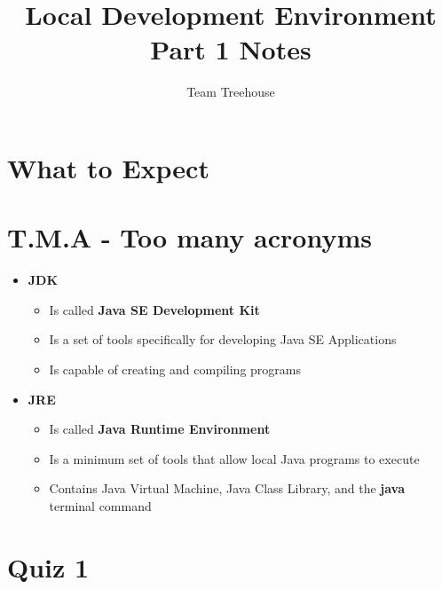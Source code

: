 \documentclass[12pt]{article}
\begin{document}
\title{Local Development Environment Part 1 Notes}
\author{Team Treehouse}
\maketitle

\section{What to Expect}

\bigskip

\section{T.M.A - Too many acronyms}

\bigskip

\begin{itemize}
    \item \textbf{JDK}
    \begin{itemize}
        \item Is called \textbf{Java SE Development Kit}
        \item Is a set of tools specifically for developing Java SE Applications
        \item Is capable of creating and compiling programs
    \end{itemize}
    \item \textbf{JRE}
    \begin{itemize}
        \item Is called \textbf{Java Runtime Environment}
        \item Is a minimum set of tools that allow local Java programs to execute
        \item Contains Java Virtual Machine, Java Class Library, and the \textbf{java}
        terminal command
    \end{itemize}
\end{itemize}

\bigskip

\section{Quiz 1}

\bigskip
\end{document}
